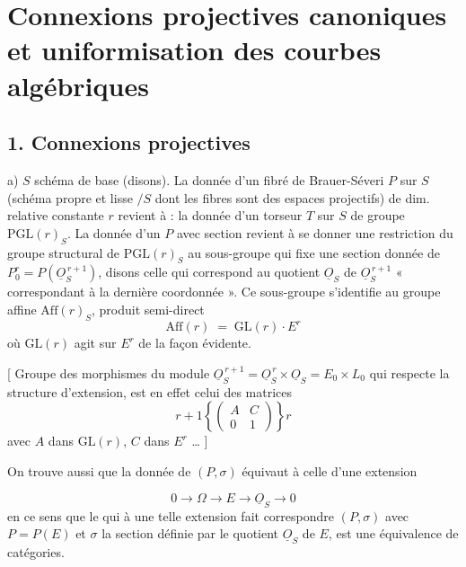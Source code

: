 \documentclass[11pt,a4paper]{article}
\begin{document}
\section*{Connexions projectives canoniques et uniformisation des courbes algébriques}


\subsection*{1. Connexions projectives}

a) $S$ schéma de base (disons). La donnée d'un fibré de Brauer-Séveri $P$ sur
$S$ (schéma propre et lisse $/S$ dont les fibres sont des espaces projectifs) de
dim. relative constante $r$ revient à : la donnée d'un torseur $T$ sur $S$ de
groupe $\mathrm{PGL}(r)_S$. La donnée d'un $P$ avec section \ill{} revient à se
donner une restriction du groupe structural de $\mathrm{PGL}(r)_S$ au
sous-groupe qui fixe une section donnée de 
$P^r_0 = P(\underline{O}_S^{\,r+1})$, disons celle qui correspond au quotient
$\underline{O}_S$ de $\underline{O}_S^{\,r+1}$ « correspondant à la dernière
coordonnée ». Ce sous-groupe s'identifie au groupe affine $\mathrm{Aff}(r)_S$,
produit semi-direct
\[
  \mathrm{Aff}(r) \;=\; \mathrm{GL}(r)\cdot E^{r}
\]
où $\mathrm{GL}(r)$ agit sur $E^r$ de la façon évidente.

[  Groupe des morphismes du module
$\underline{O}_S^{\,r+1} = \underline{O}_S^{\,r} \times \underline{O}_S
= E_0 \times L_0$ qui respecte la structure d'extension, \struck{\ill{}} est en
effet celui des matrices
\[
  {\scriptstyle r+1}
  \left\{
  \begin{pmatrix} A & C \\ 0 & 1 \end{pmatrix}
  \right\}
  {\scriptstyle r}
\]
avec $A$ \struck{\ill{}} dans $\mathrm{GL}(r)$, $C$ dans $E^r$ \ldots{} ]

On trouve aussi que la donnée de $(P,\sigma)$ équivaut à celle d'une
extension \ill{}

\[
  0 \longrightarrow \Omega \longrightarrow E \longrightarrow
  \underline{O}_S \longrightarrow 0
\]
en ce sens que le  qui à une telle extension fait
correspondre $(P,\sigma)$ avec $P = P(E)$ et $\sigma$ la section définie par le
quotient $\underline{O}_S$ de $E$, est une équivalence de catégories.
\end{document}
